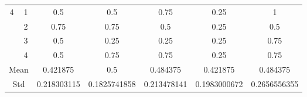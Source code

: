 \documentclass[draft,dvipsnames]{drexel-thesis}
\begin{document}
\begin{thesis}
\begin{table}[!t]
\begin{tabular}{|c|c|c|c|c|c|c|}
\multirow{4}{*}{4}    & 1                   & 0.5         & 0.5          & 0.75        & 0.25         & 1            \\ \cline{2-7} 
                      & 2                   & 0.75        & 0.75         & 0.5         & 0.25         & 0.5          \\ \cline{2-7} 
                      & 3                   & 0.5         & 0.25         & 0.25        & 0.25         & 0.75         \\ \cline{2-7} 
                      & 4                   & 0.5         & 0.75         & 0.75        & 0.25         & 0.75         \\ \hline
\multicolumn{2}{|c|}{Mean}                  & 0.421875    & 0.5          & 0.484375    & 0.421875     & 0.484375     \\ \hline
\multicolumn{2}{|c|}{Std}                   & 0.218303115 & 0.1825741858 & 0.213478141 & 0.1983000672 & 0.2656556355 \\ \hline
\end{tabular}
\end{table}


\end{thesis}
\end{document}
